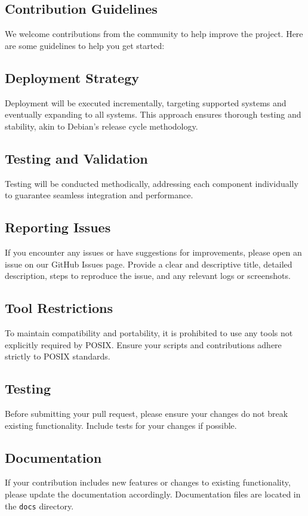 \subsection{Contribution Guidelines}
We welcome contributions from the community to help improve the project. Here are some guidelines to help you get started:

\subsection{Deployment Strategy}
Deployment will be executed incrementally, targeting supported systems and eventually expanding to all systems. This approach ensures thorough testing and stability, akin to Debian's release cycle methodology.

\subsection{Testing and Validation}
Testing will be conducted methodically, addressing each component individually to guarantee seamless integration and performance.

\subsection{Reporting Issues}
If you encounter any issues or have suggestions for improvements, please open an issue on our GitHub Issues page.
Provide a clear and descriptive title, detailed description, steps to reproduce the issue, and any relevant logs or screenshots.

\subsection{Tool Restrictions}
To maintain compatibility and portability, it is prohibited to use any tools not explicitly required by POSIX.
Ensure your scripts and contributions adhere strictly to POSIX standards.

\subsection{Testing}
Before submitting your pull request, please ensure your changes do not break existing functionality.
Include tests for your changes if possible.

\subsection{Documentation}
If your contribution includes new features or changes to existing functionality, please update the documentation accordingly.
Documentation files are located in the \texttt{docs} directory.

